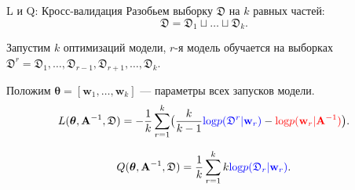 \documentclass[11pt,pdf,utf8,russian,aspectratio=169]{beamer}
\DeclareMathOperator*{\argmin}{arg\,min}
\DeclareMathOperator*{\argmax}{arg\,max}
\begin{document}

\begin{frame}{L и Q: Кросс-валидация}
Разобьем выборку $\mathfrak{D}$ на $k$ равных частей:
\[
\mathfrak{D} = \mathfrak{D}_1 \sqcup \dots \sqcup \mathfrak{D}_k.
\]

Запустим $k$ оптимизаций модели, $r$-я модель обучается на выборках $\mathfrak{D}^r = \mathfrak{D}_1,\dots,\mathfrak{D}_{r-1},\mathfrak{D}_{r+1},\dots,\mathfrak{D}_k$.

Положим $\boldsymbol{\theta} = [\mathbf{w}_1, \dots, \mathbf{w}_k]$ --- параметры всех запусков модели.
\[
L(\boldsymbol{\theta}, \mathbf{A}^{-1}, \mathfrak{D}) = -\frac{1}{k}\sum_{r=1}^k \bigl(\frac{k}{k-1}\textcolor{blue}{\text{log}p(\mathfrak{D}^r|\mathbf{w}_r)} - \textcolor{red}{\text{log}p(\mathbf{w}_r|\mathbf{A}^{-1})}\bigr).
\]

\[
Q(\boldsymbol{\theta}, \mathbf{A}^{-1}, \mathfrak{D}) = \frac{1}{k}\sum_{r=1}^k k\textcolor{blue}{\text{log}p(\mathfrak{D}_r|\mathbf{w}_r)}.
\]


\end{frame}
\end{document}
